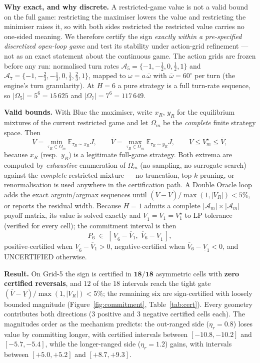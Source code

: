 \documentclass[12pt,a4paper]{article}
\newcommand{\etar}{\eta_r}
\begin{document}
\noindent\textbf{Why exact, and why discrete.}  A restricted-game value is
not a valid bound on the full game: restricting the maximiser lowers the
value and restricting the minimiser raises it, so with both sides
restricted the restricted value carries no one-sided meaning.  We therefore
certify the sign \emph{exactly within a pre-specified discretized
open-loop game} and test its stability under action-grid refinement ---
not as an exact statement about the continuous game.  The action grids are
frozen before any run: normalised turn rates
$\mathcal A_5=\{-1,-\tfrac12,0,\tfrac12,1\}$ and
$\mathcal A_7=\{-1,-\tfrac23,-\tfrac13,0,\tfrac13,\tfrac23,1\}$, mapped to
$\omega = a\,\bar\omega$ with $\bar\omega=60^\circ$ per turn (the engine's
turn granularity).  At $H=6$ a pure strategy is a full turn-rate sequence,
so $|\Omega_5|=5^6=15\,625$ and $|\Omega_7|=7^6=117\,649$.

\noindent\textbf{Valid bounds.}  With Blue the maximiser, write $x_R$,
$y_R$ for the equilibrium mixtures of the current restricted game and let
$\Omega_m$ be the \emph{complete} finite strategy space.  Then
\[
\underline{V}=\min_{\tau_R\in\Omega_m}\mathbb E_{\tau_B\sim x_R}J,
\qquad
\overline{V}=\max_{\tau_B\in\Omega_m}\mathbb E_{\tau_R\sim y_R}J,
\qquad
\underline{V}\le V^\star_m\le\overline{V},
\]
because $x_R$ (resp.\ $y_R$) is a legitimate full-game strategy.  Both
extrema are computed by \emph{exhaustive} enumeration of $\Omega_m$
(no sampling, no surrogate search) against the \emph{complete} restricted
mixture --- no truncation, top-$k$ pruning, or renormalisation is used
anywhere in the certification path.  A Double Oracle loop adds the exact
argmin/argmax sequences until
$(\overline{V}-\underline{V})/\max(1,|V_R|)<5\%$, or reports the residual
width.  Because $H=1$ admits a complete $|\mathcal A_m|\times|\mathcal
A_m|$ payoff matrix, its value is solved exactly and
$\underline{V}_1=\overline{V}_1=V_1^\star$ to LP tolerance (verified for
every cell); the commitment interval is then
\begin{equation}
P_6 \;\in\; [\,\underline{V}_6-\overline{V}_1,\;
\overline{V}_6-\underline{V}_1\,],
\label{eq:cert}
\end{equation}
positive-certified when $\underline{V}_6-\overline{V}_1>0$,
negative-certified when $\overline{V}_6-\underline{V}_1<0$, and
UNCERTIFIED otherwise.

\noindent\textbf{Result.}  On Grid-5 the sign is certified in
$\mathbf{18/18}$ asymmetric cells with \textbf{zero certified reversals},
and $12$ of the $18$ intervals reach the tight gate
$(\overline V-\underline V)/\max(1,|V_R|)<5\%$; the remaining six are
sign-certified with loosely bounded magnitude (Figure~\ref{fig:commitment},
Table~\ref{tab:cert}).  Every geometry contributes
both directions ($3$ positive and $3$ negative certified cells each).  The
magnitudes order as the mechanism predicts: the out-ranged side
($\etar=0.8$) loses value by committing longer, with certified intervals
between $[-10.8,-10.2]$ and $[-5.7,-5.4]$, while the longer-ranged side
($\etar=1.2$) gains, with intervals between $[+5.0,+5.2]$ and
$[+8.7,+9.3]$.
\end{document}
